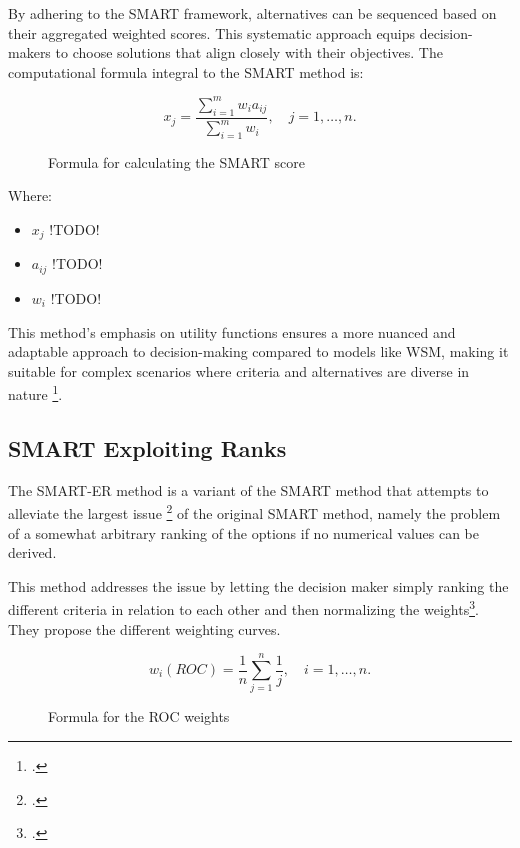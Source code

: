 By adhering to the \ac{SMART} framework, alternatives can be sequenced based on
their aggregated weighted scores. This systematic approach equips
decision-makers to choose solutions that align closely with their objectives.
The computational formula integral to the \ac{SMART} method is:


\begin{figure}[h]
    \centering
    \Large
    \[ x_j = \frac{\sum_{i=1}^{m} w_i a_{ij}}{\sum_{i=1}^{m} w_i}, \quad j = 1, \ldots, n. \]
    \caption{Formula for calculating the \ac*{SMART} score\protect\footnotemark} 
\end{figure}


Where:
\begin{itemize}
    \item \( x_j \) !TODO!
    \item \( a_{ij} \)  !TODO!
    \item \( w_i \) !TODO!
\end{itemize}

This method's emphasis on utility functions ensures a more nuanced and adaptable
approach to decision-making compared to models like WSM, making it suitable for
complex scenarios where criteria and alternatives are diverse in nature \footcite[p. 6]{fulopIntroductionDecisionMaking2005}.

\subsection{SMART Exploiting Ranks}

The \ac{SMART-ER} method is a variant of the \ac{SMART} method that attempts to alleviate the largest issue \footcitetext[p. 26]{barfodMulticriteriaDecisionAnalysis2014} of the original \ac{SMART} method, 
namely the problem of a somewhat arbitrary ranking of the options if no numerical values can be derived.

This method addresses the issue by letting the decision maker simply ranking the different criteria in relation to each other and then normalizing the weights\footcite[p. 296]{robertsWeightApproximationsMultiattribute2002a}.
They propose the different weighting curves.

\begin{figure}[h]
    \centering
    \[ w_{i}(ROC) = \frac{1}{n} \sum_{j=1}^{n} \frac{1}{j}, \quad i = 1, \ldots, n. \]
    \caption{Formula for the \ac{ROC} weights}
\end{figure}

